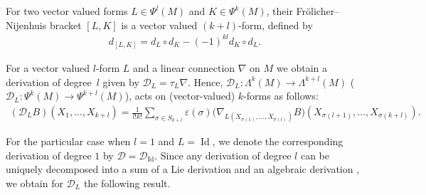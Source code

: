 \documentclass[11pt]{article}
\numberwithin{equation}{section}
\begin{document}
For two vector valued forms $L\in \Psi^l(M)$ and $K\in \Psi^k(M)$,
their Fr\"olicher--Nijenhuis bracket $[L,K]$ is a vector
valued $(k+l)$-form, def\/ined by
\begin{gather} \label{dlk}
d_{[L,K]}=d_L\circ d_K -(-1)^{kl}d_K\circ d_L.
\end{gather}

For a vector valued $l$-form $L$ and a linear connection $\nabla$
on $M$ we obtain a derivation of degree~$l$ given by ${\mathcal
D}_L=\tau_L \nabla$. Hence, ${\mathcal D}_L: \Lambda^k(M) \to
\Lambda^{k+l}(M)$ (${\mathcal D}_L: \Psi^k(M) \to
\Psi^{k+l}(M)$), acts on (vector-valued) $k$-forms as follows:
\begin{gather} \left({\mathcal
D_L}B\right)(X_1,\dots ,X_{k+l})  = \frac{1}{l!k!}
\sum_{\sigma\in S_{k+l}}
\varepsilon(\sigma)\big(\nabla_{L(X_{\sigma(1)},\dots ,X_{\sigma(l)})}B\big)\left(X_{\sigma(l+1)},\dots ,
X_{\sigma(k+l)}\right). \label{DLlk}
\end{gather}

For the particular case when $l=1$ and $L=\operatorname{Id}$, we
denote the corresponding derivation of degree $1$ by $\mathcal{D} =
\mathcal{D}_{\operatorname{Id}}$.
Since any derivation of degree $l$ can be uniquely
decomposed into a sum of a Lie derivation and an algebraic
derivation \cite[\S~8.3]{KMS93}, we obtain for ${\mathcal D}_L$
the following result.
\end{document}
